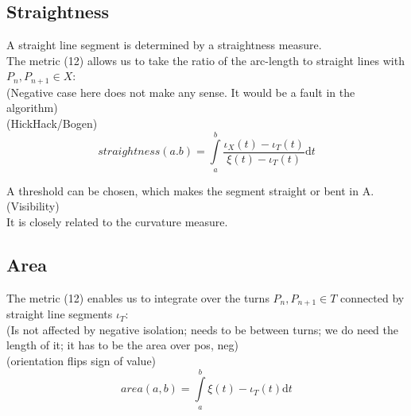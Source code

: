 \documentclass{report}
\begin{document}
\subsection{Straightness}
A straight line segment is determined by a straightness measure.\\
The metric (12) allows us to take the ratio of the arc-length to straight lines with $P_{n},P_{n+1} \in X$:\\
(Negative case here does not make any sense. It would be a fault in the algorithm)\\
(HickHack/Bogen)
\begin{equation}
straightness(a.b)=\int \limits _{a}^{b} \frac{\iota_{X}(t) - \iota_{T}(t)}{\xi(t) - \iota_{T}(t)} \mathrm{d}t
\end{equation}
\iffalse
\subsubsection{Algorithm Version}
It is using Heron's formula for the area of a triangle:
\begin{align*}
A=\lvert t_{m+1}-t_{m} \rvert\\
B=\lvert t_{m+2} - t_{m+1} \rvert\\
C=\lvert t_{m+2} - t_{m} \rvert\\
S=\frac{A+B+C}{2}
\end{align*}
to calculate the ratio of the areas in $A$ and lines in $B$:
\begin{align}
straightness([a,b])=\sum_{t=a}^{b-2}\frac{\sqrt{\xi(S)(\xi(S)-\xi(A))(\xi(S)-\xi(B))(\xi(S)-\xi(C))}}{\iota(A)+\iota(B)}
\end{align}
\fi
A threshold can be chosen, which makes the segment straight or bent in A. (Visibility)\\
It is closely related to the curvature measure.

\subsection{Area}
The metric (12) enables us to integrate over the turns $P_{n},P_{n+1} \in T$ connected by straight line segments $\iota_{T}$:\\
(Is not affected by negative isolation; needs to be between turns; we do need the length of it; it has to be the area over pos, neg)\\
(orientation flips sign of value)
\begin{equation}
area(a,b)=\int \limits _{a}^{b} \xi(t)-\iota_{T}(t) \mathrm{d}t
\end{equation}
\iffalse
\end{document}
